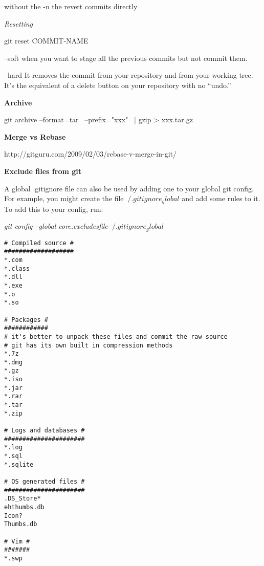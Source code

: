 \documentclass[12pt]{article}
\newcommand \tb[1]{\textbf{#1}}
\newcommand \ti[1]{\textit{#1}}
\begin{document}
without the -n the revert commits directly

\ti{Resetting}

git reset COMMIT-NAME

--soft when you want to stage all the previous commits but not commit them.

--hard It removes the commit from your repository and from your working tree. It’s the
equivalent of a delete button on your repository with no “undo.”

\tb{Archive}

git archive --format=tar \
            --prefix="xxx" \
            | gzip > xxx.tar.gz



\textbf{Merge vs Rebase}

http://gitguru.com/2009/02/03/rebase-v-merge-in-git/

\textbf{Exclude files from git}

A global .gitignore file can also be used by adding one to your 
global git config. For example, you might create the file 
$~/.gitignore_global$ and add some rules to it. To add this to your 
config, run: 

\ti{git config --global core.excludesfile $~/.gitignore_global$}


\begin{verbatim}
# Compiled source #
###################
*.com
*.class
*.dll
*.exe
*.o
*.so

# Packages #
############
# it's better to unpack these files and commit the raw source
# git has its own built in compression methods
*.7z
*.dmg
*.gz
*.iso
*.jar
*.rar
*.tar
*.zip

# Logs and databases #
######################
*.log
*.sql
*.sqlite

# OS generated files #
######################
.DS_Store*
ehthumbs.db
Icon?
Thumbs.db

# Vim #
#######
*.swp
\end{verbatim}
\end{document}
